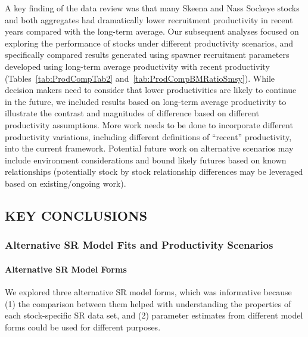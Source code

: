 \documentclass[french,11pt]{book}
\begin{document}
A key finding of the data review was that many Skeena and Nass Sockeye stocks and both aggregates had dramatically lower recruitment productivity in recent years compared with the long-term average. Our subsequent analyses focused on exploring the performance of stocks under different productivity scenarios, and specifically compared results generated using spawner recruitment parameters developed using long-term average productivity with recent productivity (Tables~\ref{tab:ProdCompTab2} and~\ref{tab:ProdCompBMRatioSmsy}). While decision makers need to consider that lower productivities are likely to continue in the future, we included results based on long-term average productivity to illustrate the contrast and magnitudes of difference based on different productivity assumptions. More work needs to be done to incorporate different productivity variations, including different definitions of ``recent'' productivity, into the current framework. Potential future work on alternative scenarios may include environment considerations and bound likely futures based on known relationships (potentially stock by stock relationship differences may be leveraged based on existing/ongoing work).

\subsection{KEY CONCLUSIONS}\label{KeyConclusions}

\subsubsection{Alternative SR Model Fits and Productivity Scenarios}\label{alternative-sr-model-fits-and-productivity-scenarios}

\paragraph{Alternative SR Model Forms}\label{alternative-sr-model-forms}

We explored three alternative SR model forms, which was informative because (1) the comparison between them helped with understanding the properties of each stock-specific SR data set, and (2) parameter estimates from different model forms could be used for different purposes.
\end{document}
